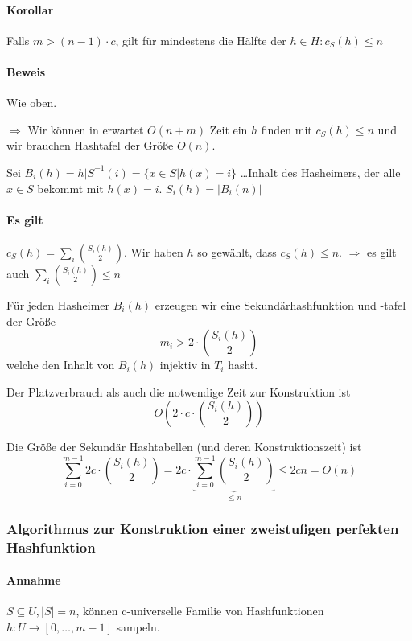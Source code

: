 \paragraph*{Korollar} Falls $m>(n-1)\cdot c$, gilt für mindestens die Hälfte der $h \in H : c_S(h) \leq n$

\paragraph*{Beweis} Wie oben.

\par\medskip
$\Rightarrow$ Wir können in erwartet $O(n+m)$ Zeit ein $h$ finden mit $c_S(h) \leq n$ und wir brauchen Hashtafel der Größe $O(n)$.\par\medskip

Sei $B_i(h)={h|S}^{-1}(i) = \{ x \in S | h(x)=i \}$ \dots Inhalt des Hasheimers, der alle $x \in S$ bekommt mit $h(x)=i$. $S_i(h) = |B_i(n)|$\par\medskip

\paragraph*{Es gilt} $c_S(h) = \sum\limits_i {S_i(h) \choose 2}$. Wir haben $h$ so gewählt, dass $c_S(h) \leq n$.
$\Rightarrow$ es gilt auch $\sum\limits_i {S_i(h) \choose 2} \leq n$

\par\medskip
Für jeden Hasheimer $B_i(h)$ erzeugen wir eine Sekundärhashfunktion und -tafel der Größe $$ m_i>2 \cdot {S_i(h) \choose 2} $$ welche den Inhalt von $B_i(h)$ injektiv in $T_i$ hasht.\par\medskip

Der Platzverbrauch als auch die notwendige Zeit zur Konstruktion ist $$ O(2 \cdot c \cdot {S_i(h) \choose 2}) $$\par\medskip

Die Größe der Sekundär Hashtabellen (und deren Konstruktionszeit) ist $$ \sum\limits_{i=0}^{m-1} 2c \cdot {S_i(h) \choose 2} = 2c \cdot \underbrace{\sum\limits_{i=0}^{m-1} {S_i(h) \choose 2}}_{\leq n} \leq 2cn = O(n)$$\par\medskip


\subsubsection{Algorithmus zur Konstruktion einer zweistufigen perfekten Hashfunktion}

\paragraph*{Annahme} $S \subseteq U, |S|=n$, können c-universelle Familie von Hashfunktionen $h: U \rightarrow [0,\dots,m-1]$ sampeln.

